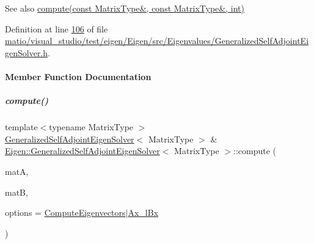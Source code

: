 \begin{DoxySeeAlso}{See also}
\hyperlink{group___eigenvalues___module_a724764fe196612b752042692156ed023}{compute(const Matrix\+Type\&, const Matrix\+Type\&, int)} 
\end{DoxySeeAlso}


Definition at line \hyperlink{matio_2visual__studio_2test_2eigen_2_eigen_2src_2_eigenvalues_2_generalized_self_adjoint_eigen_solver_8h_source_l00106}{106} of file \hyperlink{matio_2visual__studio_2test_2eigen_2_eigen_2src_2_eigenvalues_2_generalized_self_adjoint_eigen_solver_8h_source}{matio/visual\+\_\+studio/test/eigen/\+Eigen/src/\+Eigenvalues/\+Generalized\+Self\+Adjoint\+Eigen\+Solver.\+h}.



\paragraph{Member Function Documentation}
\mbox{\label{group___eigenvalues___module_a724764fe196612b752042692156ed023}} 
\subparagraph{\texorpdfstring{compute()}{compute()}\hspace{0.1cm}{\footnotesize\ttfamily [1/2]}}
{\footnotesize\ttfamily template$<$typename Matrix\+Type $>$ \\
\hyperlink{group___eigenvalues___module_class_eigen_1_1_generalized_self_adjoint_eigen_solver}{Generalized\+Self\+Adjoint\+Eigen\+Solver}$<$ Matrix\+Type $>$ \& \hyperlink{group___eigenvalues___module_class_eigen_1_1_generalized_self_adjoint_eigen_solver}{Eigen\+::\+Generalized\+Self\+Adjoint\+Eigen\+Solver}$<$ Matrix\+Type $>$\+::compute (\begin{DoxyParamCaption}\item[{const Matrix\+Type \&}]{matA,  }\item[{const Matrix\+Type \&}]{matB,  }\item[{int}]{options = {\ttfamily \hyperlink{group__enums_ggae3e239fb70022eb8747994cf5d68b4a9ada93d8885bde32b876ba4af01d3292cc}{Compute\+Eigenvectors}$\vert$\hyperlink{group__enums_ggae3e239fb70022eb8747994cf5d68b4a9a1a7cefbb22c2c3928d246b753cf53633}{Ax\+\_\+l\+Bx}} }\end{DoxyParamCaption})}



